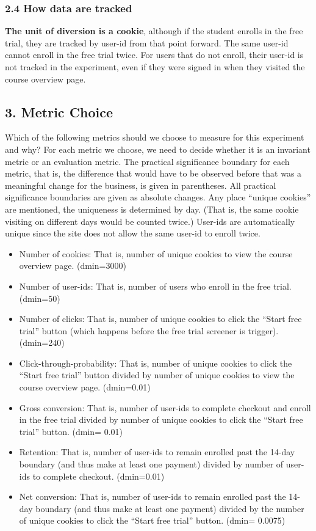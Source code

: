 \documentclass[11pt]{article}
\providecommand{\tightlist}{%
      \setlength{\itemsep}{0pt}\setlength{\parskip}{0pt}}
\begin{document}
    \hypertarget{how-data-are-tracked}{%
\subsubsection{2.4 How data are tracked}\label{how-data-are-tracked}}

\textbf{The unit of diversion is a cookie}, although if the student
enrolls in the free trial, they are tracked by user-id from that point
forward. The same user-id cannot enroll in the free trial twice. For
users that do not enroll, their user-id is not tracked in the
experiment, even if they were signed in when they visited the course
overview page.

    \hypertarget{metric-choice}{%
\subsection{3. Metric Choice}\label{metric-choice}}

    Which of the following metrics should we choose to measure for this
experiment and why? For each metric we choose, we need to decide whether
it is an invariant metric or an evaluation metric. The practical
significance boundary for each metric, that is, the difference that
would have to be observed before that was a meaningful change for the
business, is given in parentheses. All practical significance boundaries
are given as absolute changes. Any place ``unique cookies'' are
mentioned, the uniqueness is determined by day. (That is, the same
cookie visiting on different days would be counted twice.) User-ids are
automatically unique since the site does not allow the same user-id to
enroll twice.

    \begin{itemize}
\tightlist
\item
  Number of cookies: That is, number of unique cookies to view the
  course overview page. (dmin=3000)
\item
  Number of user-ids: That is, number of users who enroll in the free
  trial. (dmin=50)
\item
  Number of clicks: That is, number of unique cookies to click the
  ``Start free trial'' button (which happens before the free trial
  screener is trigger). (dmin=240)
\item
  Click-through-probability: That is, number of unique cookies to click
  the ``Start free trial'' button divided by number of unique cookies to
  view the course overview page. (dmin=0.01)
\item
  Gross conversion: That is, number of user-ids to complete checkout and
  enroll in the free trial divided by number of unique cookies to click
  the ``Start free trial'' button. (dmin= 0.01)
\item
  Retention: That is, number of user-ids to remain enrolled past the
  14-day boundary (and thus make at least one payment) divided by number
  of user-ids to complete checkout. (dmin=0.01)
\item
  Net conversion: That is, number of user-ids to remain enrolled past
  the 14-day boundary (and thus make at least one payment) divided by
  the number of unique cookies to click the ``Start free trial'' button.
  (dmin= 0.0075)
\end{itemize}
\end{document}
